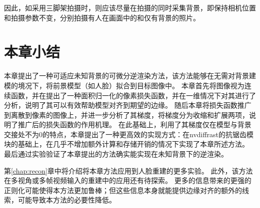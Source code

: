因此，如采用三脚架拍摄时，则应该尽量在拍摄的同时采集背景，即保持相机位置和拍摄参数不变，分别拍摄有人在画面中的和仅有背景的照片。

\section*{本章小结}

本章提出了一种可适应未知背景的可微分逆渲染方法，该方法能够在无需对背景建模的境况下，将前景模型（如人脸）拟合到目标图像中。
本章首先将图像视为连续函数，并在提出了一种面积归一化的像素损失函数，并在一维情况下对其进行了分析，说明了其可以有效帮助模型对齐到期望的边缘。
随后本章将损失函数推广到离散到像素的图像上，并进一步分析了其梯度，将梯度分为收缩和扩展两项，说明了推广后的损失函数的作用机理。
在此基础上，利用了其梯度仅在模型与背景交接处不为0的特点，本章提出了一种更高效的实现方式：在nvdiffrast的抗锯齿模块的基础上，在几乎不增加额外计算和存储开销的情况下实现了本章所述方法。
最后通过实验验证了本章提出的方法确实能实现在未知背景下的逆渲染。

第\ref{chap:recon}章中将介绍将本章方法应用到人脸重建的更多实验。
此外，该方法在多视角或多帧视频输入的重建中的应用还有待探索。
更多的信息带来的更强的正则化可能使得本方法更加鲁棒；但这些信息本身就能提供边缘对齐的额外的线索，可能导致本方法的必要性降低。
